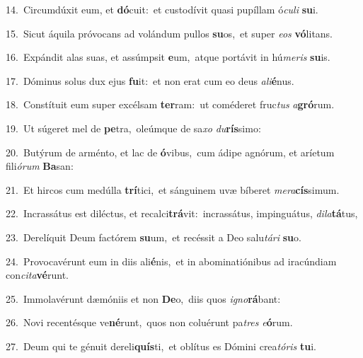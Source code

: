 {\numbfont\textcolor{\numbcolor}{14.}}~Circumdúxit eum, et \textbf{dó}\-cuit:~\star et custodívit quasi pupíllam ó\-\textit{cu}\-\textit{li} \textbf{su}\-i.\par
{\numbfont\textcolor{\numbcolor}{15.}}~Sicut áquila próvocans ad volándum pullos \textbf{su}\-os,~\star et super \textit{e}\-\textit{os} \textbf{vó}\-litans.\par
{\numbfont\textcolor{\numbcolor}{16.}}~Expándit alas suas, et assúmpsit \textbf{e}\-um,~\star atque portávit in hú\-\textit{me}\-\textit{ris} \textbf{su}\-is.\par
{\numbfont\textcolor{\numbcolor}{17.}}~Dóminus solus dux ejus \textbf{fu}\-it:~\star et non erat cum eo deus \textit{a}\-\textit{li}\textbf{é}nus.\par
{\numbfont\textcolor{\numbcolor}{18.}}~Constítuit eum super excélsam \textbf{ter}\-ram:~\star ut coméderet fruc\textit{tus} \textit{a}\-\textbf{gró}rum.\par
{\numbfont\textcolor{\numbcolor}{19.}}~Ut súgeret mel de \textbf{pe}\-tra,~\star oleúmque de sa\textit{xo} \textit{du}\-\textbf{rís}simo:\par
{\numbfont\textcolor{\numbcolor}{20.}}~Butýrum de arménto, et lac de \textbf{ó}\-vibus,~\star cum ádipe agnórum, et aríetum fili\-\textit{ó}\-\textit{rum} \textbf{Ba}\-san:\par
{\numbfont\textcolor{\numbcolor}{21.}}~Et hircos cum medúlla \textbf{trí}\-tici,~\star et sánguinem uvæ bíberet \textit{me}\-\textit{ra}\textbf{cís}simum.\par
{\numbfont\textcolor{\numbcolor}{22.}}~Incrassátus est diléctus, et recalci\-\textbf{trá}\-vit:~\star incrassátus, impinguátus, \textit{di}\-\textit{la}\textbf{tá}tus,\par
{\numbfont\textcolor{\numbcolor}{23.}}~Derelíquit Deum factórem \textbf{su}\-um,~\star et recéssit a Deo salu\-\textit{tá}\-\textit{ri} \textbf{su}\-o.\par
{\numbfont\textcolor{\numbcolor}{24.}}~Provocavérunt eum in diis ali\-\textbf{é}\-nis,~\star et in abominatiónibus ad iracúndiam con\-\textit{ci}\-\textit{ta}\textbf{vé}runt.\par
{\numbfont\textcolor{\numbcolor}{25.}}~Immolavérunt dæmóniis et non \textbf{De}\-o,~\star diis quos \textit{i}\-\textit{gno}\textbf{rá}bant:\par
{\numbfont\textcolor{\numbcolor}{26.}}~Novi recentésque ve\-\textbf{né}\-runt,~\star quos non coluérunt pa\textit{tres} \textit{e}\-\textbf{ó}rum.\par
{\numbfont\textcolor{\numbcolor}{27.}}~Deum qui te génuit dereli\-\textbf{quís}\-ti,~\star et oblítus es Dómini crea\-\textit{tó}\-\textit{ris} \textbf{tu}\-i.\par
